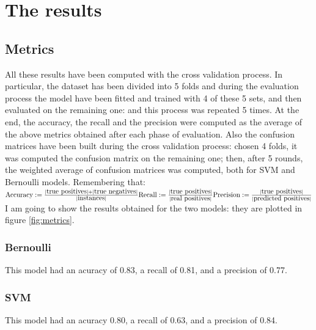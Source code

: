 \documentclass[12pt]{article}
\begin{document}
\section{The results}
\label{sec:results}
\subsection{Metrics}
All these results have been computed with the cross validation process. In particular, the dataset has been divided into 5 folds and during the evaluation process the model have been fitted and trained with 4 of these 5 sets, and then evaluated on the remaining one: and this process was repeated 5 times. At the end, the accuracy, the recall and the precision were computed as the average of the above metrics obtained after each phase of evaluation. Also the confusion matrices have been built during the cross validation process: chosen 4 folds, it was computed the confusion matrix on the remaining one; then, after 5 rounds, the weighted average of confusion matrices was computed, both for SVM and Bernoulli models. Remembering that:
$
\newline\newline
\mbox{Accuracy}:= \frac{|\mbox{true positives}| + |\mbox{true negatives}|}{|\mbox{instances}|}
\newline\newline
\mbox{Recall}:= \frac{|\mbox{true positives}|}{|\mbox{real positives}|}
\newline\newline
\mbox{Precision}:= \frac{|\mbox{true positives}|}{|\mbox{predicted positives}|}
\newline\newline
$
I am going to show the results obtained for the two models: they are plotted in figure \ref{fig:metrics}.

\subsubsection{Bernoulli}
This model had an acuracy of 0.83, a recall of 0.81, and a precision of 0.77.

\subsubsection{SVM}
This model had an acuracy 0.80, a recall of 0.63, and a precision of 0.84.
\end{document}
